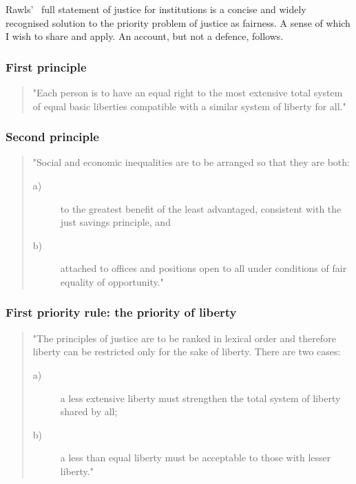 \documentclass[11pt, oneside]{article}   	%
\begin{document}
Rawls'~\cite{jr1} full statement of justice for institutions is a concise and widely recognised solution to the priority problem of justice as fairness. A sense of which I wish to share and apply. An account, but not a defence, follows.

\subsubsection{First principle}

\begin{quote}
"Each person is to have an equal right to the most extensive total system of equal basic liberties compatible with a similar system of liberty for all."
\end{quote}

\subsubsection{Second principle}

\begin{quote}
"Social and economic inequalities are to be arranged so that they are both:
\begin{description}
\item[ a)] to the greatest benefit of the least advantaged, consistent with the just savings principle, and
\item[ b)] attached to offices and positions open to all under conditions of fair equality of opportunity."
\end{description}
\end{quote}

\subsubsection{First priority rule: the priority of liberty}

\begin{quote}
"The principles of justice are to be ranked in lexical order and therefore liberty can be restricted only for the sake of liberty.
There are two cases:
\begin{description}
\item[ a)] a less extensive liberty must strengthen the total system of liberty shared by all;
\item[ b)] a less than equal liberty must be acceptable to those with lesser liberty."
\end{description}
\end{quote}
\end{document}
